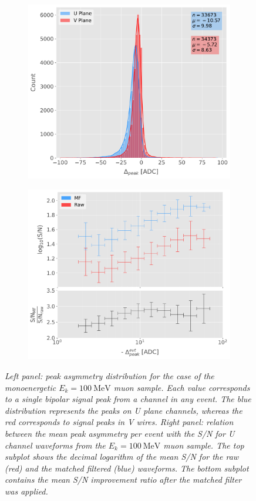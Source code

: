 \begin{figure}[t]
	\begin{subfigure}{0.5\textwidth}
		\centering
		\includegraphics[width=.99\linewidth]{Images/Matched_Filter/deltaPeak_dist}
	\end{subfigure}
	\begin{subfigure}{0.5\textwidth}
		\centering
		\includegraphics[width=.99\linewidth]{Images/Matched_Filter/deltaPeak_SN_ratio}
	\end{subfigure}
	\caption{\textit{Left panel: peak asymmetry distribution for the case of the monoenergetic $E_{k} = 100 \ \mathrm{MeV}$ muon sample. Each value corresponds to a single bipolar signal peak from a channel in any event. The blue distribution represents the peaks on U plane channels, whereas the red corresponds to signal peaks in V wires. Right panel: relation between the mean peak asymmetry per event with the S/N for U channel waveforms from the $E_{k} = 100 \ \mathrm{MeV}$ muon sample. The top subplot shows the decimal logarithm of the mean S/N for the raw (red) and the matched filtered (blue) waveforms. The bottom subplot contains the mean S/N improvement ratio after the matched filter was applied.}}
	\label{fig:asymmetry}
\end{figure}
